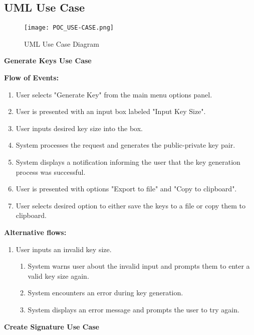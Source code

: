 \documentclass[]{final_report}
\theoremstyle{definition}
\begin{document}
\subsection{UML Use Case}
\begin{figure}[H]
    \centering
    \texttt{[image: POC\_USE-CASE.png]}
    \caption{UML Use Case Diagram}
    \label{fig:uc}
\end{figure}

\textbf{Generate Keys Use Case}

\noindent\textbf{Flow of Events:}
\begin{enumerate}
    \item User selects "Generate Key" from the main menu options panel.
    \item User is presented with an input box labeled "Input Key Size".
    \item User inputs desired key size into the box.
    \item System processes the request and generates the public-private key pair.
    \item System displays a notification informing the user that the key generation process was successful.
    \item User is presented with options "Export to file" and "Copy to clipboard".
    \item User selects desired option to either save the keys to a file or copy them to clipboard.
\end{enumerate}

\noindent\textbf{Alternative flows:}
\begin{enumerate}
    \item User inputs an invalid key size.
    \begin{enumerate}
        \item System warns user about the invalid input and prompts them to enter a valid key size again.
        \item System encounters an error during key generation.
        \item System displays an error message and prompts the user to try again.
    \end{enumerate}
\end{enumerate}

\textbf{Create Signature Use Case}
\end{document}
